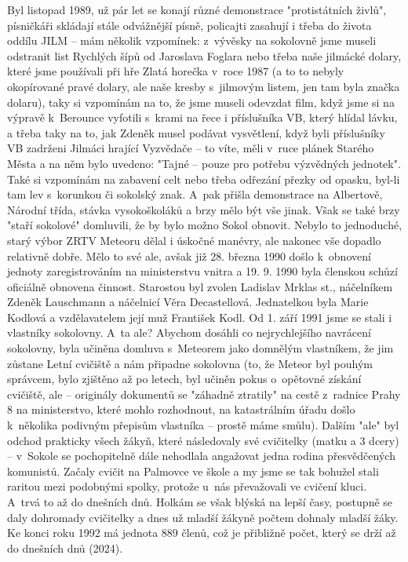 \documentclass[a5paper, 11pt, twoside]{article}
\begin{document}
\noindent
Byl listopad 1989, už pár let se konají různé demonstrace "protistátních
živlů", písničkáři skládají stále odvážnější písně, policajti zasahují
i třeba do života oddílu JILM -- mám několik vzpomínek: z~vývěsky na
sokolovně jsme museli odstranit list Rychlých šípů od Jaroslava Foglara
nebo třeba naše jilmácké dolary, které jsme používali při hře Zlatá
horečka v~roce 1987 (a to to nebyly okopírované pravé dolary, ale naše
kresby s~jilmovým listem, jen tam byla značka dolaru), taky si vzpomínám
na to, že jsme museli odevzdat film, když jsme si na výpravě k~Berounce
vyfotili s~krami na řece i příslušníka VB, který hlídal lávku, a třeba
taky na to, jak Zdeněk musel podávat vysvětlení, když byli příslušníky
VB zadrženi Jilmáci hrající Vyzvědače -- to víte, měli v~ruce plánek
Starého Města a na něm bylo uvedeno: "Tajné -- pouze pro potřebu
výzvědných jednotek". Také si vzpomínám na zabavení celt nebo třeba
odřezání přezky od opasku, byl-li tam lev s~korunkou či sokolský znak.
A~pak přišla demonstrace na Albertově, Národní třída, stávka vysokoškoláků
a brzy mělo být vše jinak. Však se také brzy "staří sokolové"
domluvili, že by bylo možno Sokol obnovit. Nebylo to jednoduché, starý
výbor ZRTV Meteoru dělal i úskočné manévry, ale nakonec vše dopadlo
relativně dobře. Mělo to své ale, avšak již 28. března 1990 došlo
k~obnovení jednoty zaregistrováním na ministerstvu vnitra a 19. 9. 1990
byla členskou schůzí oficiálně obnovena činnost. Starostou byl zvolen
Ladislav Mrklas st., náčelníkem Zdeněk Lauschmann a náčelnicí Věra
Decastellová. Jednatelkou byla Marie Kodlová a vzdělavatelem její muž
František Kodl. Od 1. září 1991 jsme se stali i vlastníky sokolovny.
A~ta ale? Abychom dosáhli co nejrychlejšího navrácení sokolovny, byla
učiněna domluva s~Meteorem jako domnělým vlastníkem, že jim zůstane
Letní cvičiště a nám připadne sokolovna (to, že Meteor byl pouhým
správcem, bylo zjištěno až po letech, byl učiněn pokus o~opětovné
získání cvičiště, ale -- originály dokumentů se "záhadně ztratily" na
cestě z~radnice Prahy 8 na ministerstvo, které mohlo rozhodnout, na
katastrálním úřadu došlo k~několika podivným přepisům vlastníka --
prostě máme smůlu). Dalším "ale" byl odchod prakticky všech žákyň,
které následovaly své cvičitelky (matku a 3 dcery) -- v~Sokole se
pochopitelně dále nehodlala angažovat jedna rodina přesvědčených
komunistů. Začaly cvičit na Palmovce ve škole a my jsme se tak bohužel
stali raritou mezi podobnými spolky, protože u~nás převažovali ve
cvičení kluci. A~trvá to až do dnešních dnů. Holkám se však blýská na
lepší časy, postupně se daly dohromady cvičitelky a dnes už mladší
žákyně počtem dohnaly mladší žáky. Ke konci roku 1992 má jednota 889
členů, což je přibližně počet, který se drží až do dnešních dnů (2024).
\end{document}
